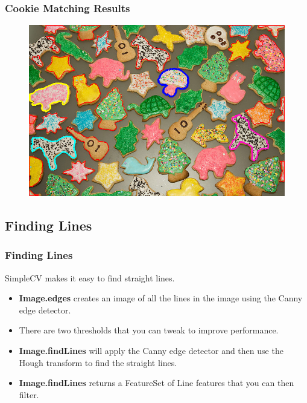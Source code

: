 \documentclass{beamer}
\begin{document}
\begin{frame}
\frametitle{Cookie Matching Results}
 \begin{figure}
     \includegraphics[width=0.7\linewidth]{matchingblobs.png}
 \end{figure}
\end{frame}
\subsection{Finding Lines}
\begin{frame}
  \frametitle{Finding Lines}
SimpleCV makes it easy to find straight lines.
\begin{itemize}
\item \textbf{Image.edges} creates an image of all the lines in the
  image using the Canny edge detector.
\item There are two thresholds that you can tweak to improve
  performance. 
\item \textbf{Image.findLines} will apply the Canny edge detector and
  then use the Hough transform to find the straight lines.
\item \textbf{Image.findLines} returns a FeatureSet of Line features
  that you can then filter.
\end{itemize}
\end{frame}
\end{document}
